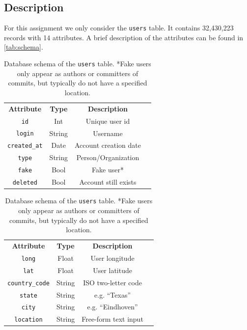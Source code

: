 \documentclass{article}
\begin{document}
    \subsection{Description}
    For this assignment we only consider the \texttt{users} table. It contains 32,430,223 records with 14 attributes. A brief description of the attributes can be found in \autoref{tab:schema}.

    \begin{table}[ht]
        \centering
        \begin{minipage}[b]{0.48\linewidth}
            \centering
            \begin{tabular}{|c|c|c|c|}
            \hline
            \textbf{Attribute} & \textbf{Type} & \textbf{Description} \\
            \Xhline{2\arrayrulewidth}
            \texttt{id} & Int & Unique user id \\
            \hline
            \texttt{login} & String & Username \\
            \hline
            \texttt{created\_at} & Date & Account creation date \\
            \hline
            \texttt{type} & String & Person/Organization \\
            \hline
            \texttt{fake} & Bool & Fake user*\\
            \hline
            \texttt{deleted} & Bool & Account still exists\\
            \hline
            \end{tabular}
        \end{minipage}
        \begin{minipage}[b]{0.48\linewidth}
            \centering
            \begin{tabular}{|c|c|c|c|}
            \hline
            \textbf{Attribute} & \textbf{Type} & \textbf{Description}\\
            \Xhline{2\arrayrulewidth}

            \texttt{long} & Float & User longitude \\
            \hline
            \texttt{lat} & Float & User latitude \\
            \hline
            \texttt{country\_code} & String & ISO two-letter code\\
            \hline
            \texttt{state} & String & e.g. ``Texas'' \\
            \hline
            \texttt{city} & String &  e.g. ``Eindhoven''\\
            \hline
            \texttt{location} & String &  Free-form text input\\
            \hline
            \end{tabular}
        \end{minipage}
    \caption{Database schema of the \texttt{users} table. *Fake users only appear as authors or committers of commits, but typically do not have a specified location.}
    \label{tab:schema}
    \end{table}
    
\end{document}
